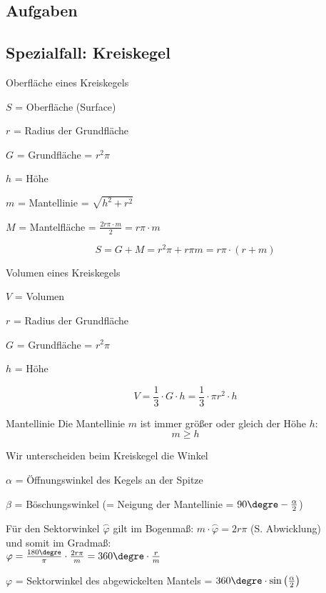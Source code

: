 \subsection*{Aufgaben}
\newpage

\subsection{Spezialfall: Kreiskegel}


\begin{gesetz}{Oberfläche eines Kreiskegels}{}

  $S$ = Oberfläche (Surface)

  $r$ = Radius der Grundfläche
  
  $G$ = Grundfläche = $r^2\pi$

  $h$ = Höhe

  $m$ = Mantellinie = $\sqrt{h^2 + r^2}$
  
  $M$ = Mantelfläche = $\frac{2r\pi \cdot{} m}2 = r\pi\cdot{}m$

  
  $$S = G + M = r^2\pi + r\pi m = r\pi\cdot{}(r+m)$$
\end{gesetz}


\begin{gesetz}{Volumen eines Kreiskegels}{}

  $V$ = Volumen

  $r$ = Radius der Grundfläche
  
  $G$ = Grundfläche = $r^2\pi$

  $h$ = Höhe

  $$V = \frac13\cdot{} G\cdot{}h = \frac13 \cdot{} \pi r^2 \cdot{} h$$
\end{gesetz}


\begin{bemerkung}{Mantellinie}{}
  Die Mantellinie $m$ ist immer größer oder gleich der Höhe $h$:
  $$m \ge{} h$$
\end{bemerkung}

\newpage


\begin{bemerkung}{}{}
  Wir unterscheiden beim Kreiskegel die Winkel

  $\alpha$ = Öffnungswinkel des Kegels an der Spitze

  $\beta$ = Böschungswinkel (= Neigung der Mantellinie = $90\degre - \frac{\alpha}{2}$)

  Für den Sektorwinkel $\stackrel{\frown}{\varphi}$ gilt im Bogenmaß: $m\cdot\stackrel{\frown}{\varphi} = 2r\pi$ (S. Abwicklung)\\
  und somit im Gradmaß:\\ $\varphi = \frac{180\degre}\pi \cdot \frac{2r\pi}m = 360\degre\cdot{}\frac{r}m$ 
  
  $\varphi$ = Sektorwinkel des abgewickelten Mantels = $360\degre \cdot \sin\left(\frac{\alpha}2\right)$

\end{bemerkung}

